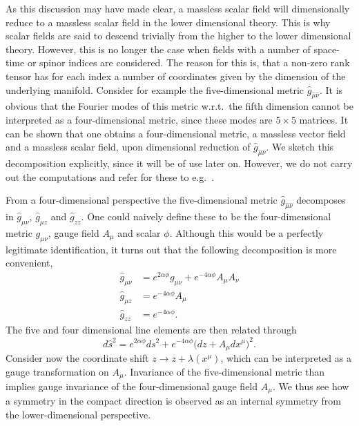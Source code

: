 \documentclass[12pt,twoside]{book}
\begin{document}
As this discussion may have made clear, a massless scalar field will dimensionally reduce to a massless scalar field in the lower dimensional theory. This is why scalar fields are said to descend trivially from the higher to the lower dimensional theory. However, this is no longer the case when fields with a number of space-time or spinor indices are considered. The reason for this is, that a non-zero rank tensor has for each index a number of coordinates given by the dimension of the underlying manifold. Consider for example the five-dimensional metric $\hat{g}_{\hat{\mu}\hat{\nu}}$. It is obvious that the Fourier modes of this metric w.r.t.\ the fifth dimension cannot be interpreted as a four-dimensional metric, since these modes are $5\times 5$ matrices. It can be shown that one obtains a four-dimensional metric, a massless vector field and a massless scalar field, upon dimensional reduction of $\hat{g}_{\hat{\mu}\hat{\nu}}$. We sketch this decomposition explicitly, since it will be of use later on. However, we do not carry out the computations and refer for these to e.g.\ \cite{Ortin:gravity,PopeKK}.

From a four-dimensional perspective the five-dimensional metric $\hat{g}_{\hat{\mu}\hat{\nu}}$ decomposes in $\hat{g}_{\mu\nu}$, $\hat{g}_{\mu z}$ and $\hat{g}_{zz}$. One could naively define these to be the four-dimensional metric $g_{\mu\nu}$, gauge field $A_{\mu}$ and scalar $\phi$. Although this would be a perfectly legitimate identification, it turns out that the following decomposition is more convenient,
\begin{equation}
\begin{split}
\hat{g}_{\mu\nu} &= e^{2\alpha \phi} g_{\mu\nu} + e^{-4\alpha \phi} A_{\mu} A_{\nu} \\
\hat{g}_{\mu z} &= e^{-4\alpha \phi} A_{\mu} \\
\hat{g}_{zz} &= e^{-4\alpha \phi}.
\end{split}
\end{equation}
The five and four dimensional line elements are then related through
\begin{equation}
d\hat{s}^{2} = e^{2\alpha \phi} ds^{2} + e^{-4\alpha \phi} \big( dz + A_{\mu}dx^{\mu} \big)^{2}.
\end{equation}
Consider now the coordinate shift $z \rightarrow z + \lambda(x^{\mu})$, which can be interpreted as a gauge transformation on $A_{\mu}$. Invariance of the five-dimensional metric than implies gauge invariance of the four-dimensional gauge field $A_{\mu}$. We thus see how a symmetry in the compact direction is observed as an internal symmetry from the lower-dimensional perspective.
\end{document}
